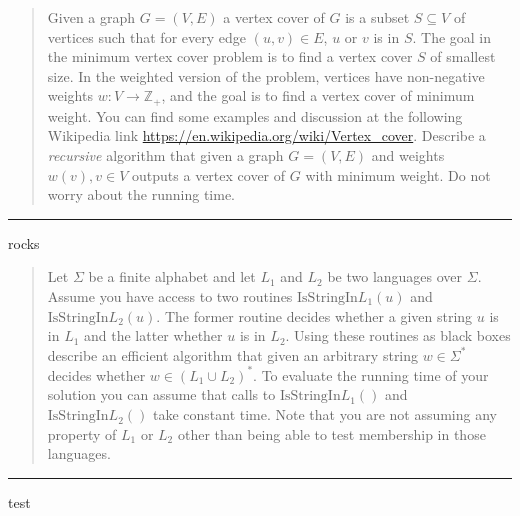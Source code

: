 \documentclass[11pt]{article}
\newcommand{\IsSinlang}[1]{\text{IsStringIn}L_{#1}}
\begin{document}



\begin{quote}
    Given a graph $G=(V,E)$ a vertex cover of $G$ is a subset
  $S \subseteq V$ of vertices such that for every edge $(u,v) \in E$,
  $u$ or $v$ is in $S$. The goal in the minimum vertex cover problem
  is to find a vertex cover $S$ of smallest size. In the weighted
  version of the problem, vertices have non-negative weights
  $w: V \rightarrow \mathbb{Z}_+$, and the goal is to find a vertex
  cover of minimum weight.  You can find some examples and discussion
  at the following Wikipedia link
  \url{https://en.wikipedia.org/wiki/Vertex_cover}.  Describe a {\em
    recursive} algorithm that given a graph $G=(V,E)$ and weights
  $w(v), v \in V$ outputs a vertex cover of $G$ with minimum
  weight. Do not worry about the running time.

\end{quote}
\hrule



\begin{solution}
rocks
\end{solution}


\begin{quote}
    Let $\Sigma$ be a finite alphabet and let $L_1$ and $L_2$ be two
  languages over $\Sigma$. Assume you have access to two routines
  $\IsSinlang{1}(u)$ and $\IsSinlang{2}(u)$. The former routine
  decides whether a given string $u$ is in $L_1$ and the latter
  whether $u$ is in $L_2$. Using these routines as black boxes
  describe an efficient algorithm that given an arbitrary string
  $w \in \Sigma^*$ decides whether $w \in (L_1 \cup L_2)^*$. To
  evaluate the running time of your solution you can assume that calls
  to $\IsSinlang{1}()$ and $\IsSinlang{2}()$ take constant time. Note
  that you are not assuming any property of $L_1$ or $L_2$ other than
  being able to test membership in those languages.
\end{quote}
\hrule



\begin{solution}
test
\end{solution}

\end{document}
